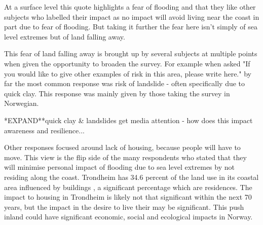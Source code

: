 At a surface level this quote highlights a fear of flooding and that they like other subjects who labelled their impact as no impact will avoid living near the coast in part due to fear of flooding. But taking it further the fear here isn't simply of sea level extremes but of land falling away. 

This fear of land falling away is brought up by several subjects at multiple points when given the opportunity to broaden the survey. For example when asked "If you would like to give other examples of risk in this area, please write here." by far the most common response was risk of landslide - often specifically due to quick clay. This response was mainly given by those taking the survey in Norwegian. 

*EXPAND**quick clay & landslides get media attention - how does this impact awareness and resilience...

Other responses focused around lack of housing, because people will have to move. This view is the flip side of the many respondents who stated that they will minimise personal impact of flooding due to sea level extremes by not residing along the coast. 
Trondheim has 34.6 percent of the land use in its coastal area influenced by buildings \cite{engebakken_construction_2022}, a significant percentage which are residences. The impact to housing in Trondheim is likely not that significant within the next 70 years, but the impact in the desire to live their may be significant. This push inland could have significant economic, social and ecological impacts in Norway. 